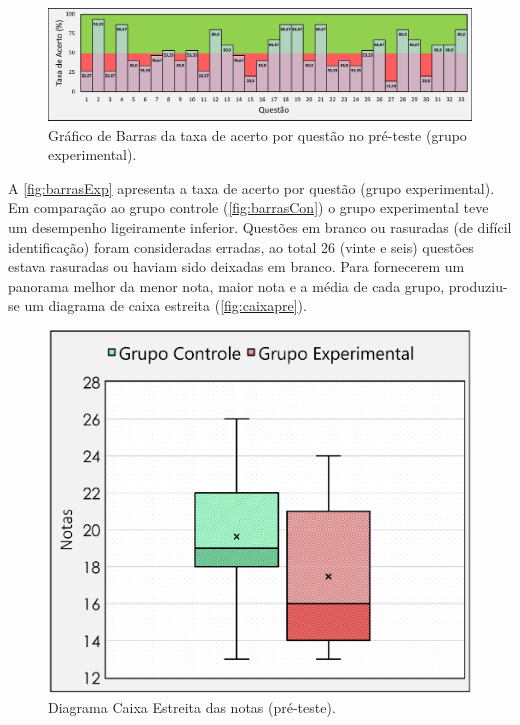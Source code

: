 \begin{figure}[htb]

    \caption{\label{fig:barrasExp}Gráfico de Barras da taxa de acerto por questão no pré-teste (grupo experimental).}
    \includegraphics[width=\linewidth]{./Visuais/Notas3.pdf}
  
\end{figure}

A \autoref{fig:barrasExp} apresenta a taxa de acerto por questão (grupo experimental). Em comparação ao grupo controle (\autoref{fig:barrasCon}) o grupo experimental teve um desempenho ligeiramente inferior. Questões em branco ou rasuradas (de difícil identificação) foram consideradas erradas, ao total 26 (vinte e seis) questões estava rasuradas ou haviam sido deixadas em branco. Para fornecerem um panorama melhor da menor nota, maior nota e a média de cada grupo, produziu-se um diagrama de caixa estreita (\autoref{fig:caixapre}).

\begin{figure}%
    \vspace{-4pt}
    \caption{\label{fig:caixapre}Diagrama Caixa Estreita das notas (pré-teste).}
    \vspace{8pt}
    \includegraphics[width=\linewidth]{./Visuais/CaixaEstreitaEnfeitado.pdf}
\end{figure}

